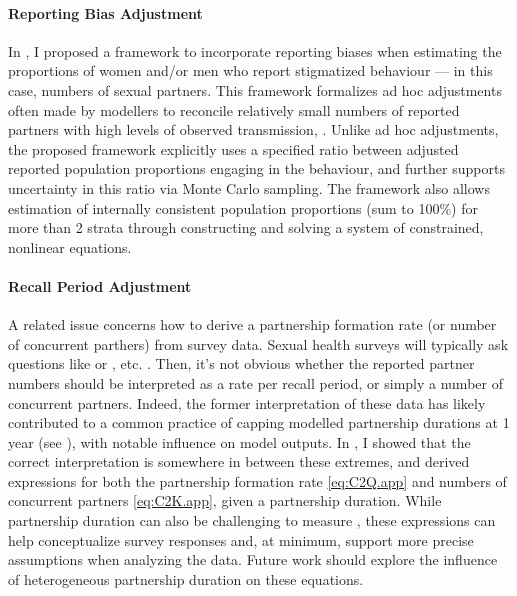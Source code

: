 \paragraph{Reporting Bias Adjustment}
In , I proposed a framework to incorporate reporting biases
when estimating the proportions of women and/or men who report stigmatized behaviour
--- in this case, numbers of sexual partners.
This framework formalizes ad hoc adjustments often made by modellers
to reconcile relatively small numbers of reported partners
with high levels of observed transmission, \eg \cite{Anderson2014}.
Unlike ad hoc adjustments, the proposed framework explicitly uses
a specified ratio between adjusted \vs reported population proportions engaging in the behaviour,
and further supports uncertainty in this ratio via Monte Carlo sampling.
The framework also allows estimation of
internally consistent population proportions (\ie sum to 100\%) for more than 2 strata
through constructing and solving a system of constrained, nonlinear equations.
\paragraph{Recall Period Adjustment}
A related issue concerns how to derive a partnership formation rate
(or number of concurrent parthers) from survey data.
Sexual health surveys will typically ask questions like
 \cite{DHS}
or , etc. \cite{Baral2014,EswKP2014,EswSBSS2002}.
Then, it's not obvious whether the reported partner numbers should be interpreted as
a rate per recall period, or simply a number of concurrent partners.
Indeed, the former interpretation of these data has likely contributed to
a common practice of capping modelled partnership durations at 1 year (see ),
with notable influence on model outputs.
In , I showed that the correct interpretation
is somewhere in between these extremes,
and derived expressions for both
the partnership formation rate \eqref{eq:C2Q.app}
and numbers of concurrent partners \eqref{eq:C2K.app}, given a partnership duration.
While partnership duration can also be challenging to measure \cite{Burington2010},
these expressions can help conceptualize survey responses and,
at minimum, support more precise assumptions when analyzing the data.
Future work should explore the influence of heterogeneous partnership duration on these equations.

